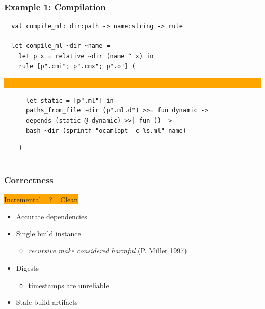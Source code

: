 \documentclass{beamer}
\begin{document}
%
% 


\begin{frame}[fragile]
\frametitle{Example 1: Compilation}
{\footnotesize
\begin{verbatim}
  val compile_ml: dir:path -> name:string -> rule
  
  let compile_ml ~dir ~name =
    let p x = relative ~dir (name ^ x) in
    rule [p".cmi"; p".cmx"; p".o"] (
\end{verbatim}
\vskip-16pt\hskip18pt
\colorbox{orange}{\parbox[t][2.3cm][t]{8.7cm}{\ }}\vspace*{-2.5cm}
\begin{verbatim}
      let static = [p".ml"] in
      paths_from_file ~dir (p".ml.d") >>= fun dynamic ->
      depends (static @ dynamic) >>| fun () ->
      bash ~dir (sprintf "ocamlopt -c %s.ml" name)
\end{verbatim}
\begin{verbatim}
    )


\end{verbatim}}
\end{frame}

%
%


\begin{frame}[fragile]
\frametitle{Correctness}
\begin{center}\colorbox{orange}{Incremental =?= Clean}\end{center}
\begin{itemize}
\item Accurate dependencies
\item Single build instance
\begin{itemize}
\item {\em recursive make considered harmful} (P. Miller 1997)
\end{itemize}
\item Digests
\begin{itemize}
\item timestamps are unreliable
\end{itemize}
\item Stale build artifacts
\end{itemize}
\end{frame}
\end{document}
